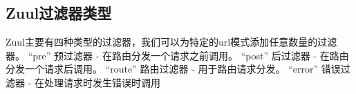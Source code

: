 \documentclass[../../../interview-questions.tex]{subfiles}
\begin{document}
\subsection{Zuul过滤器类型}

Zuul主要有四种类型的过滤器，我们可以为特定的url模式添加任意数量的过滤器。
“pre” 预过滤器 - 在路由分发一个请求之前调用。
“post” 后过滤器 - 在路由分发一个请求后调用。
“route” 路由过滤器 - 用于路由请求分发。
“error” 错误过滤器 - 在处理请求时发生错误时调用
\end{document}
